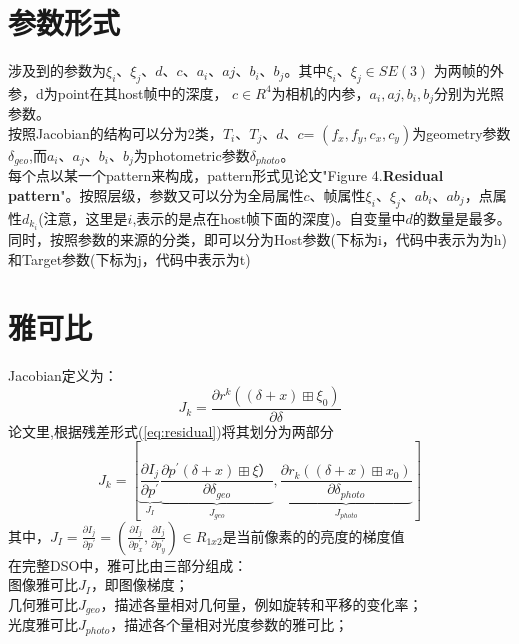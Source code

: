 \section{参数形式}  %
涉及到的参数为$\xi_{i}$、$\xi_{j}$、$d$、$c$、$a_{i}$、$a{j}$、$b_{i}$、$b_{j}$。其中$\xi_{i}$、$\xi_{j}\in SE(3)$ 为两帧的外参，d为point在其host帧中的深度， $c\in R^4$为相机的内参，$a_{i},a{j},b_{i},b_{j}$分别为光照参数。 \\
\indent 按照Jacobian的结构可以分为2类，$T_{i}$、$T_{j}$、$d$、$c$= $(f_{x},f_{y},c_{x},c_{y})$为geometry参数$\delta_{geo}$,而$a_{i}$、$a_{j}$、$b_{i}$、$b_{j}$为photometric参数$\delta_{photo}$。\\
\indent 每个点以某一个pattern来构成，pattern形式见论文"Figure 4.\textbf{Residual pattern}"。按照层级，参数又可以分为全局属性$c$、帧属性$\xi_{i}$、$\xi_{j}$、$ab_{i}$、$ab_{j}$，点属性$d_{k_i}$(注意，这里是$i$,表示的是点在host帧下面的深度)。自变量中$d$的数量是最多。\\
\indent 同时，按照参数的来源的分类，即可以分为Host参数(下标为i，代码中表示为为h)和Target参数(下标为j，代码中表示为t)


\section{雅可比}
Jacobian定义为：
\begin{equation}
	J_{k}=\frac{\partial r^k((\delta+x)\boxplus\xi_0)}{\partial\delta}
\end{equation}
论文里,根据残差形式(\ref{eq:residual})将其划分为两部分
\begin{equation}
	J_{k}=[\underbrace{\frac{\partial I_j}{\partial p^{'}}}_{J_I} \underbrace{\frac{\partial p^{'}(\delta+x)\boxplus\xi）}{\partial\delta_{geo}}}_{J_{geo}}, \underbrace{\frac{\partial r_{k}((\delta+x)\boxplus x_0)}{\partial\delta_{photo}}}_{J_{photo}}]
\end{equation}
其中，$J_I=\frac{\partial I_j}{\partial p^{'}}=(\frac{\partial I_j}{\partial p_x^{'}},\frac{\partial I_j}{\partial p_y^{'}})\in R_{1x2}$是当前像素的的亮度的梯度值\\
在完整DSO中，雅可比由三部分组成：\\
图像雅可比$J_I$，即图像梯度；\\
几何雅可比$J_{geo}$，描述各量相对几何量，例如旋转和平移的变化率；\\
光度雅可比$J_{photo}$，描述各个量相对光度参数的雅可比；\\

